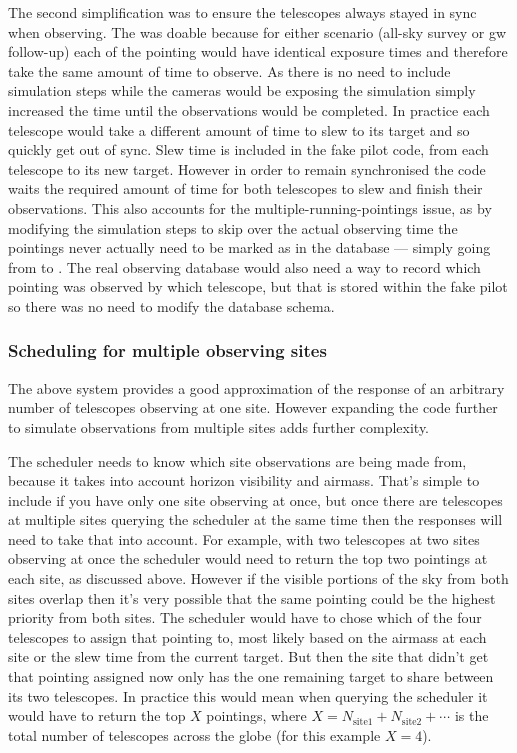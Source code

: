 \begin{colsection}
\begin{colsection}
The second simplification was to ensure the telescopes always stayed in sync when observing. The was doable because for either scenario (all-sky survey or \gls{gw} follow-up) each of the pointing would have identical exposure times and therefore take the same amount of time to observe. As there is no need to include simulation steps while the cameras would be exposing the simulation simply increased the time until the observations would be completed. In practice each telescope would take a different amount of time to slew to its target and so quickly get out of sync. Slew time is included in the fake pilot code, from each telescope to its new target. However in order to remain synchronised the code waits the required amount of time for both telescopes to slew and finish their observations. This also accounts for the multiple-running-pointings issue, as by modifying the simulation steps to skip over the actual observing time the pointings never actually need to be marked as  in the database --- simply going from  to . The real observing database would also need a way to record which pointing was observed by which telescope, but that is stored within the fake pilot so there was no need to modify the database schema.

\subsubsection{Scheduling for multiple observing sites}

The above system provides a good approximation of the response of an arbitrary number of telescopes observing at one site. However expanding the code further to simulate observations from multiple sites adds further complexity.

The scheduler needs to know which site observations are being made from, because it takes into account horizon visibility and airmass. That's simple to include if you have only one site observing at once, but once there are telescopes at multiple sites querying the scheduler at the same time then the responses will need to take that into account. For example, with two telescopes at two sites observing at once the scheduler would need to return the top two pointings at each site, as discussed above. However if the visible portions of the sky from both sites overlap then it's very possible that the same pointing could be the highest priority from both sites. The scheduler would have to chose which of the four telescopes to assign that pointing to, most likely based on the airmass at each site or the slew time from the current target. But then the site that didn't get that pointing assigned now only has the one remaining target to share between its two telescopes. In practice this would mean when querying the scheduler it would have to return the top $X$ pointings, where $X = N_\text{site1} + N_\text{site2} + \cdots$ is the total number of telescopes across the globe (for this example $X=4$).


\end{colsection}
\end{colsection}
